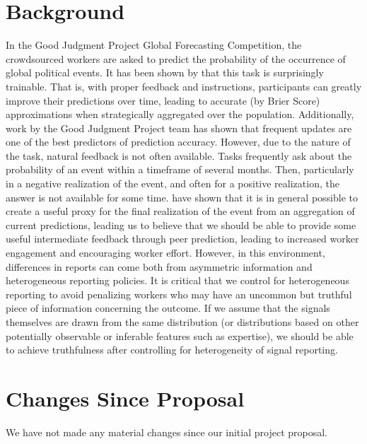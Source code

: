 \documentclass[a4paper, 12pt]{article}
\begin{document}
\section{Background}
In the Good Judgment Project Global Forecasting Competition, the crowdsourced workers are asked to predict the probability of the occurrence of global political events. It has been shown by \citet{ungar2012good} that this task is surprisingly trainable. That is, with proper feedback and instructions, participants can greatly improve their predictions over time, leading to accurate (by Brier Score) approximations when strategically aggregated over the population. Additionally, work by the Good Judgment Project team has shown that frequent updates are one of the best predictors of prediction accuracy. However, due to the nature of the task, natural feedback is not often available. Tasks frequently ask about the probability of an event within a timeframe of several months. Then, particularly in a negative realization of the event, and often for a positive realization, the answer is not available for some time. \citet{witkowski2017proper} have shown that it is in general possible to create a useful proxy for the final realization of the event from an aggregation of current predictions, leading us to believe that we should be able to provide some useful intermediate feedback through peer prediction, leading to increased worker engagement and encouraging worker effort. However, in this environment, differences in reports can come both from asymmetric information and heterogeneous reporting policies. It is critical that we control for heterogeneous reporting to avoid penalizing workers who may have an uncommon but truthful piece of information concerning the outcome. If we assume that the signals themselves are drawn from the same distribution (or distributions based on other potentially observable or inferable features such as expertise), we should be able to achieve truthfulness after controlling for heterogeneity of signal reporting. 

% 
\section{Changes Since Proposal}
We have not made any material changes since our initial project proposal.
\end{document}
